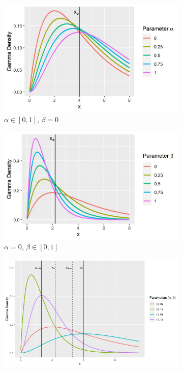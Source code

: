 \documentclass[11pt]{article}
\begin{document}
	\begin{figure}
		\centering
		\begin{subfigure}[b]{0.32\textwidth}
			\centering
			\includegraphics[width=\textwidth]{gamma_minorization_1a.jpg}
			\caption{$\alpha \in [0, 1]$, $\beta=0$}
			\label{fig:gam1a}
		\end{subfigure}
		\hfill
		\begin{subfigure}[b]{0.32\textwidth}
			\centering
			\includegraphics[width=\textwidth]{gamma_minorization_1b.jpg}
			\caption{$\alpha = 0$, $\beta \in [0, 1]$}
			\label{fig:gam1b}
		\end{subfigure}
		\hfill
		\begin{subfigure}[b]{0.32\textwidth}
		    \centering
		    \includegraphics[width=\textwidth]{gamma_minorization_2.jpg}

\end{subfigure}
\end{figure}
\end{document}
